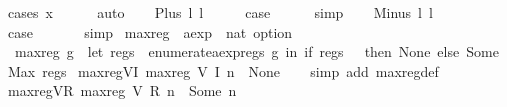 \begin{isabellebody}
\ {\isacharparenleft}cases\ x{\isacharparenright}\isanewline
\ \ \ \ \isamarkupfalse%
\ auto\isanewline
{}\isamarkupfalse%
\isanewline
\ \ \isamarkupfalse%
\ {\isacharparenleft}Plus\ l{}\ l{}{\isacharparenright}\isanewline
\ \ \isamarkupfalse%
\ \isamarkupfalse%
\ {\isacharquery}case\isanewline
\ \ \ \ \isamarkupfalse%
\ simp\isanewline
{}\isamarkupfalse%
\isanewline
\ \ \isamarkupfalse%
\ {\isacharparenleft}Minus\ l{}\ l{}{\isacharparenright}\isanewline
\ \ \isamarkupfalse%
\ \isamarkupfalse%
\ {\isacharquery}case\ \isanewline
\ \ \ \ \isamarkupfalse%
\ simp\isanewline
{}\isamarkupfalse%
%
\endisatagproof
{\isafoldproof}%
%
\isadelimproof
\isanewline
%
\endisadelimproof
\isanewline
{}\isamarkupfalse%
\ max{\isacharunderscore}reg\ {\isacharcolon}{\isacharcolon}\ {\isachardoublequoteopen}aexp\ {\isasymRightarrow}\ nat\ option{\isachardoublequoteclose}\ \isanewline
\ \ {\isachardoublequoteopen}max{\isacharunderscore}reg\ g\ {\isacharequal}\ {\isacharparenleft}let\ regs\ {\isacharequal}\ {\isacharparenleft}enumerate{\isacharunderscore}aexp{\isacharunderscore}regs\ g{\isacharparenright}\ in\ if\ regs\ {\isacharequal}\ {\isacharbraceleft}{\isacharbraceright}\ then\ None\ else\ Some\ {\isacharparenleft}Max\ regs{\isacharparenright}{\isacharparenright}{\isachardoublequoteclose}\isanewline
\isanewline
{}\isamarkupfalse%
\ max{\isacharunderscore}reg{\isacharunderscore}V{\isacharunderscore}I{\isacharcolon}\ {\isachardoublequoteopen}max{\isacharunderscore}reg\ {\isacharparenleft}V\ {\isacharparenleft}I\ n{\isacharparenright}{\isacharparenright}\ {\isacharequal}\ None{\isachardoublequoteclose}\isanewline
%
\isadelimproof
\ \ %
\endisadelimproof
%
\isatagproof
{}\isamarkupfalse%
\ {\isacharparenleft}simp\ add{\isacharcolon}\ max{\isacharunderscore}reg{\isacharunderscore}def{\isacharparenright}%
\endisatagproof
{\isafoldproof}%
%
\isadelimproof
\isanewline
%
\endisadelimproof
\isanewline
{}\isamarkupfalse%
\ max{\isacharunderscore}reg{\isacharunderscore}V{\isacharunderscore}R{\isacharcolon}\ {\isachardoublequoteopen}max{\isacharunderscore}reg\ {\isacharparenleft}V\ {\isacharparenleft}R\ n{\isacharparenright}{\isacharparenright}\ {\isacharequal}\ Some\ n{\isachardoublequoteclose}\isanewline
%
\isadelimproof
\ \ %
\endisadelimproof
%
\isatagproof
{}\isamarkupfalse%

\end{isabellebody}
